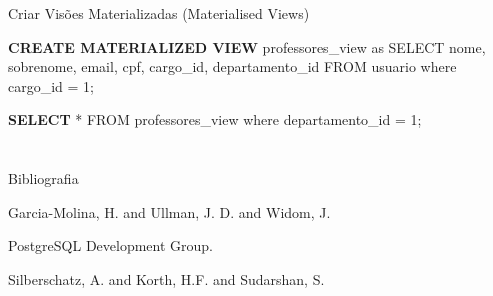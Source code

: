 \documentclass[xcolor=x11names,compress]{beamer}
\begin{document}
\begin{frame}{Criar Visões Materializadas (Materialised Views)}

\begin{alertblock}{}
\textbf{CREATE MATERIALIZED VIEW} professores\_view as SELECT nome, sobrenome, email, cpf, cargo\_id, departamento\_id FROM usuario where cargo\_id = 1;
\end{alertblock}

\begin{alertblock}{}

\textbf{SELECT} * FROM professores\_view where departamento\_id = 1;

\end{alertblock}

\end{frame}

\section{}

\begin{frame}{Bibliografia}

\begin{thebibliography}{Garcia-MolinaEtAl, 2008}


Garcia-Molina, H. and Ullman, J. D. and Widom, J.



PostgreSQL Development Group.



Silberschatz, A. and Korth, H.F. and Sudarshan, S.


\end{thebibliography}

\end{frame}
\end{document}
